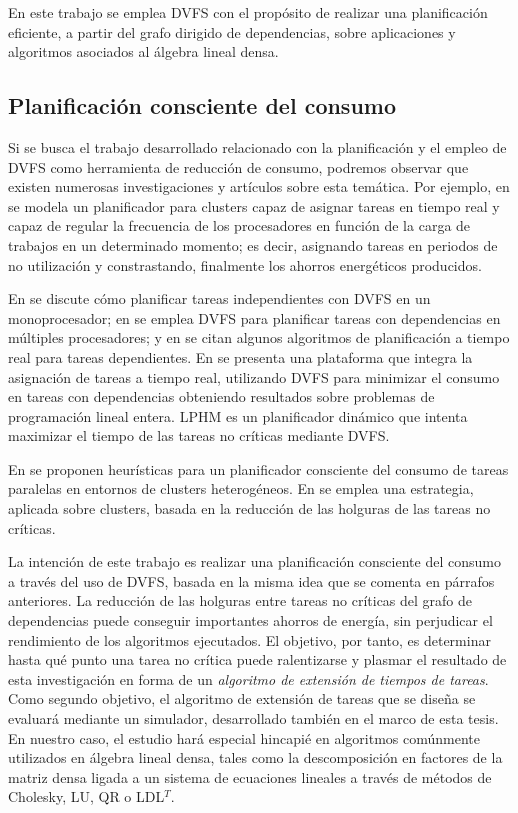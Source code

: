 En este trabajo se emplea DVFS con el propósito de realizar una planificación eficiente,
a partir del grafo dirigido de dependencias, sobre aplicaciones y algoritmos asociados al álgebra lineal densa.

\subsection{Planificación consciente del consumo}

Si se busca el trabajo desarrollado relacionado con la planificación y el
empleo de DVFS como herramienta de reducción de consumo, podremos observar que 
existen numerosas investigaciones y artículos sobre esta temática. Por ejemplo, en 
\cite{Etinski} se modela un planificador para clusters capaz de asignar 
tareas en tiempo real y capaz de regular la frecuencia de  
los procesadores en función de la carga de trabajos en un determinado momento; es decir, 
asignando tareas en periodos de no utilización y constrastando, finalmente los ahorros energéticos 
producidos.

En \cite{Yao,Manzak} se discute cómo planificar tareas independientes con DVFS en un 
monoprocesador; en \cite{yeon, Gruian} se emplea DVFS para planificar tareas
con dependencias en múltiples procesadores; y en \cite{Martin,Luo,Luo2} se citan
algunos algoritmos de planificación a tiempo real para tareas dependientes. En 
\cite{Zhang} se presenta una plataforma que integra la asignación de tareas a tiempo real, 
utilizando DVFS para minimizar el consumo en tareas con dependencias obteniendo resultados sobre
problemas de programación lineal entera. LPHM \cite{Robert} es un 
planificador dinámico que intenta maximizar el tiempo de las tareas no 
críticas mediante DVFS.

En \cite{lee2009minimizing} se proponen heurísticas para un planificador consciente del consumo
de tareas paralelas en entornos de clusters heterogéneos. En \cite{kimura2007emprical} se
emplea una estrategia, aplicada sobre clusters, basada en la reducción de las holguras
de las tareas no críticas.

La intención de este trabajo es realizar una planificación consciente del consumo
a través del uso de DVFS, basada en la misma idea que se comenta en párrafos anteriores. 
La reducción de las holguras entre tareas no críticas del grafo de dependencias puede
conseguir importantes ahorros de energía, sin perjudicar el rendimiento de los algoritmos
ejecutados.  El objetivo, por tanto, es determinar hasta qué punto una tarea no crítica
puede ralentizarse y plasmar el resultado de esta investigación en forma de un \emph{algoritmo 
de extensión de tiempos de tareas}. Como segundo objetivo, el algoritmo de extensión de tareas que se 
diseña se evaluará mediante un simulador, desarrollado también en el marco de esta tesis.
En nuestro caso, el estudio hará especial hincapié en algoritmos comúnmente utilizados 
en álgebra lineal densa, tales como la descomposición en factores de la matriz densa ligada 
a un sistema de ecuaciones lineales a través de métodos de Cholesky, LU, QR o LDL$^T$.


